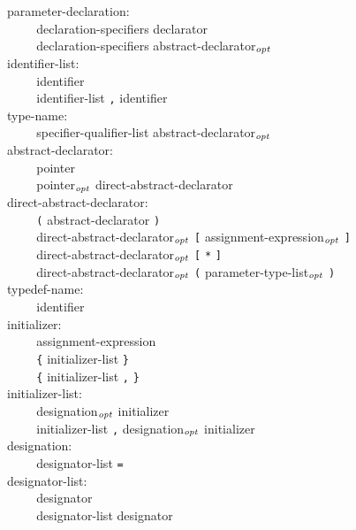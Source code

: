 \documentclass[12pt]{report}
\def\|{\verb|}
\newcommand\opt{$_{{\it opt}}$ }
\begin{document}
\noindent
parameter-declaration:\\
\|    | declaration-specifiers declarator\\
\|    | declaration-specifiers abstract-declarator\opt\\

\noindent
identifier-list:\\
\|    | identifier\\
\|    | identifier-list \verb+,+ identifier\\

\noindent
type-name:\\
\|    | specifier-qualifier-list abstract-declarator\opt\\

\noindent
abstract-declarator:\\
\|    | pointer\\
\|    | pointer\opt direct-abstract-declarator\\

\noindent
direct-abstract-declarator:\\
\|    | \verb+(+ abstract-declarator \verb+)+\\
\|    | direct-abstract-declarator\opt \verb+[+ assignment-expression\opt \verb+]+\\
\|    | direct-abstract-declarator\opt \verb+[+ \verb+*+ \verb+]+\\
\|    | direct-abstract-declarator\opt \verb+(+ parameter-type-list\opt \verb+)+\\

\noindent
typedef-name:\\
\|    | identifier\\

\noindent
initializer:\\
\|    | assignment-expression\\
\|    | \verb+{+ initializer-list \verb+}+\\
\|    | \verb+{+ initializer-list \verb+,+ \verb+}+\\

\noindent
initializer-list:\\
\|    | designation\opt initializer\\
\|    | initializer-list \verb+,+ designation\opt initializer\\

\noindent
designation:\\
\|    | designator-list \verb+=+\\

\noindent
designator-list:\\
\|    | designator\\
\|    | designator-list designator\\
\end{document}
